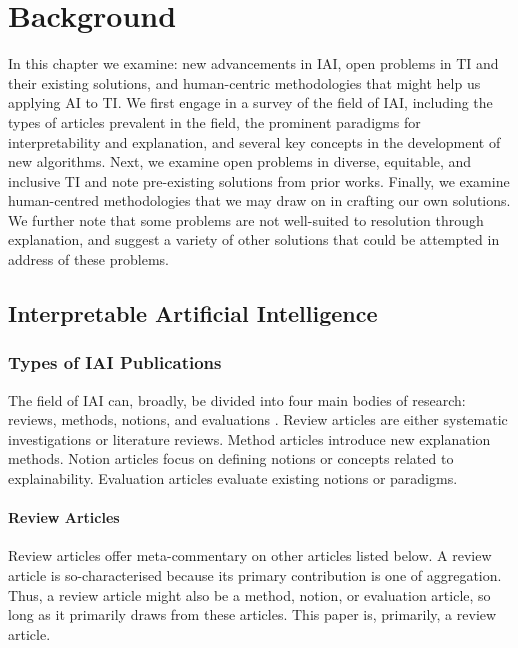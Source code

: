 

\chapter{\label{ch:background}Background} 
In this chapter we examine: new advancements in  IAI, open problems in TI and their existing solutions, and human-centric methodologies that might help us applying AI to TI. We first engage in a survey of the field of IAI, including the types of articles prevalent in the field, the prominent paradigms for interpretability and explanation, and several key concepts in the development of new algorithms. Next, we examine open problems in diverse, equitable, and inclusive TI and note pre-existing solutions from prior works. Finally, we examine human-centred methodologies that we may draw on in crafting our own solutions. We further note that some problems are not well-suited to resolution through explanation, and suggest a variety of other solutions that could be attempted in address of these problems.

\minitoc

\section{Interpretable Artificial Intelligence}
\subsection{Types of IAI Publications}
The field of IAI can, broadly, be divided into four main bodies of research: reviews, methods, notions, and evaluations \cite{vilone_explainable_2020}. Review articles are either systematic investigations or literature reviews. Method articles introduce new explanation methods. Notion articles focus on defining notions or concepts related to explainability. Evaluation articles evaluate existing notions or paradigms.

\subsubsection{Review Articles}
Review articles offer meta-commentary on other articles listed below. A review article is so-characterised because its primary contribution is one of aggregation. Thus, a review article might also be a method, notion, or evaluation article, so long as it primarily draws from these articles. This paper is, primarily, a review article.

